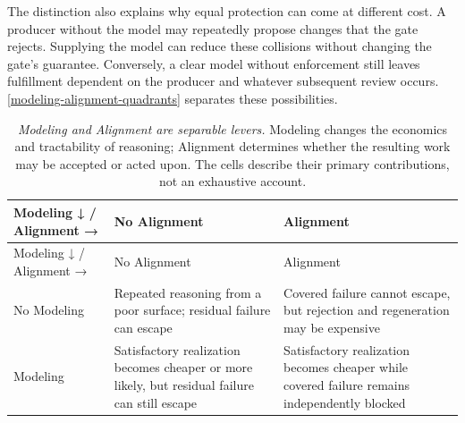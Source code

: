 The distinction also explains why equal protection can come at different cost. A producer without the model may repeatedly propose changes that the gate rejects. Supplying the model can reduce these collisions without changing the gate's guarantee. Conversely, a clear model without enforcement still leaves fulfillment dependent on the producer and whatever subsequent review occurs. \autoref{modeling-alignment-quadrants} separates these possibilities.

{\footnotesize
\begin{longtable}[]{@{}
  >{\raggedright\arraybackslash}p{}
  >{\raggedright\arraybackslash}p{}
  >{\raggedright\arraybackslash}p{}@{}}
\caption[The four Modeling × Alignment combinations]{\emph{Modeling and Alignment are separable levers.} Modeling changes the economics and tractability of reasoning; Alignment determines whether the resulting work may be accepted or acted upon. The cells describe their primary contributions, not an exhaustive account.}\label{modeling-alignment-quadrants}\tabularnewline
\toprule\noalign{}
\begin{minipage}[b]{\linewidth}\raggedright
Modeling ↓ / Alignment →
\end{minipage} & \begin{minipage}[b]{\linewidth}\raggedright
No Alignment
\end{minipage} & \begin{minipage}[b]{\linewidth}\raggedright
Alignment
\end{minipage} \\
\midrule\noalign{}
\endfirsthead
\toprule\noalign{}
\begin{minipage}[b]{\linewidth}\raggedright
Modeling ↓ / Alignment →
\end{minipage} & \begin{minipage}[b]{\linewidth}\raggedright
No Alignment
\end{minipage} & \begin{minipage}[b]{\linewidth}\raggedright
Alignment
\end{minipage} \\
\midrule\noalign{}
\endhead
\bottomrule\noalign{}
\endlastfoot
No Modeling & Repeated reasoning from a poor surface; residual failure can escape & Covered failure cannot escape, but rejection and regeneration may be expensive \\
Modeling & Satisfactory realization becomes cheaper or more likely, but residual failure can still escape & Satisfactory realization becomes cheaper while covered failure remains independently blocked \\
\end{longtable}
}

